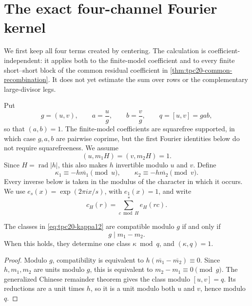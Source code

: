 \section{The exact four-channel Fourier kernel}
\label{sec:tpc20-kernel-fourier}

We first keep all four terms created by centering.  The calculation is
coefficient-independent: it applies both to the finite-model coefficient
and to every finite short--short block of the common residual coefficient
in \cref{thm:tpc20-common-recombination}.  It does not yet estimate the
sum over rows or the complementary large-divisor legs.

Put
\begin{equation}
 g=(u,v),\qquad a=\frac{u}{g},\qquad b=\frac{v}{g},\qquad
 q=[u,v]=gab,
 \label{eq:tpc20-gabq}
\end{equation}
so that \((a,b)=1\).  The finite-model coefficients are squarefree
supported, in which case \(g,a,b\) are pairwise coprime, but the first
Fourier identities below do not require squarefreeness.  We assume
\begin{equation}
 (u,m_1H)=(v,m_2H)=1.
 \label{eq:tpc20-primitive-moduli}
\end{equation}
Since \(H=\operatorname{rad}|h|\), this also makes \(h\) invertible modulo
\(u\) and \(v\).  Define
\begin{equation}
 \kappa_1\equiv-h\overline{m_1}\pmod u,
 \qquad
 \kappa_2\equiv-h\overline{m_2}\pmod v.
 \label{eq:tpc20-kappa12}
\end{equation}
Every inverse below is taken in the modulus of the character in which it
occurs.  We use \(e_s(x)=\exp(2\pi i x/s)\), with \(e_1(x)=1\), and write
\begin{equation}
 c_H(r)=\sum_{c\bmod H}^{*}e_H(rc).
 \label{eq:tpc20-cH}
\end{equation}

\begin{lemma}
\label{lem:tpc20-primitive-compatibility}
The classes in \eqref{eq:tpc20-kappa12} are compatible modulo \(g\) if
and only if
\begin{equation}
 g\mid m_1-m_2.
 \label{eq:tpc20-compatible-determinant}
\end{equation}
When this holds, they determine one class \(\kappa\bmod q\), and
\((\kappa,q)=1\).
\end{lemma}

\begin{proof}
Modulo \(g\), compatibility is equivalent to
\(h(\overline{m_1}-\overline{m_2})\equiv0\).  Since \(h,m_1,m_2\) are
units modulo \(g\), this is equivalent to
\(m_2-m_1\equiv0\pmod g\).  The generalized
Chinese remainder theorem gives the class modulo \([u,v]=q\).  Its
reductions are a unit times \(h\), so it is a unit modulo both \(u\) and
\(v\), hence modulo \(q\).
\end{proof}

